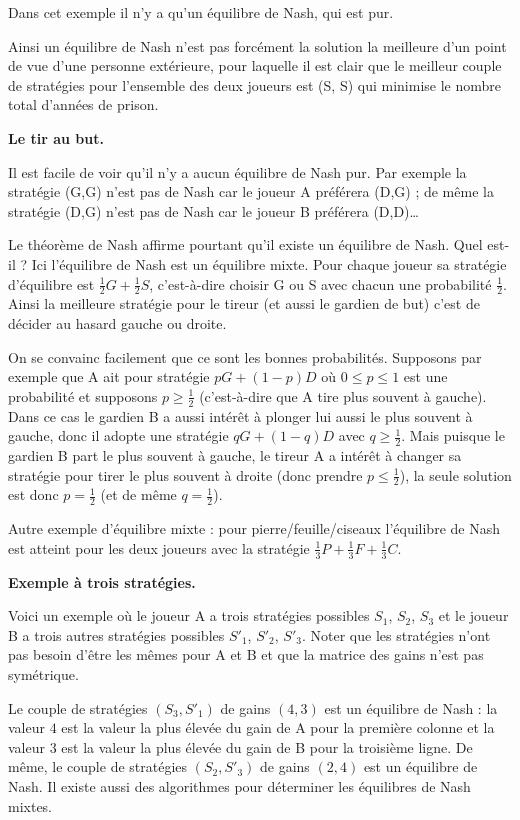 \documentclass[11pt,class=report,crop=false]{standalone}
\begin{document}
Dans cet exemple il n'y a qu'un équilibre de Nash, qui est pur.

Ainsi un équilibre de Nash n'est pas forcément la solution la meilleure d'un point de vue d'une personne extérieure, pour laquelle il est clair que le meilleur couple de stratégies pour l'ensemble des deux joueurs est (S, S) qui minimise le nombre total d'années de prison.


\bigskip
\textbf{Le tir au but.}




Il est facile de voir qu'il n'y a aucun équilibre de Nash pur. Par exemple la stratégie (G,G) n'est pas de Nash car le joueur A préférera (D,G) ; de même la stratégie (D,G) n'est pas de Nash car le joueur B préférera (D,D)\ldots

Le théorème de Nash affirme pourtant qu'il existe un équilibre de Nash. Quel est-il ? 
Ici l'équilibre de Nash est un équilibre mixte. Pour chaque joueur sa stratégie d'équilibre est $\frac12G+ \frac12S$, c'est-à-dire choisir G ou S avec chacun une probabilité $\frac12$. Ainsi la meilleure stratégie pour le tireur (et aussi le gardien de but) c'est de décider au hasard gauche ou droite.

On se convainc facilement que ce sont les bonnes probabilités. Supposons par exemple que A ait pour stratégie $pG + (1-p)D$ où $0 \le p \le 1$ est une probabilité
et supposons $p \ge \frac12$ (c'est-à-dire que A tire plus souvent à gauche). Dans ce cas le gardien B a aussi intérêt à plonger lui aussi le plus souvent à gauche, donc il adopte une stratégie $qG+(1-q)D$ avec $q \ge \frac12$. Mais puisque le gardien B part le plus souvent à gauche, le tireur A a intérêt à changer sa stratégie pour tirer le plus souvent à droite (donc prendre $p \le \frac12$), la seule solution est donc $p = \frac12$ (et de même $q=\frac12$).


Autre exemple d'équilibre mixte : pour \og{}pierre/feuille/ciseaux\fg{} l'équilibre de Nash est atteint pour les deux joueurs avec la stratégie $\frac13P+\frac13F+\frac13C$.




\bigskip
\textbf{Exemple à trois stratégies.}

Voici un exemple où le joueur A a trois stratégies possibles $S_1$, $S_2$, $S_3$ et le joueur B a trois autres stratégies possibles $S'_1$, $S'_2$, $S'_3$. Noter que les stratégies n'ont pas besoin d'être les mêmes pour A et B et que la matrice des gains n'est pas symétrique. 


Le couple de stratégies $(S_3,S'_1)$ de gains $(4,3)$ est un équilibre de Nash : la valeur $4$ est la valeur la plus élevée du gain de A pour la première colonne et la valeur $3$ est la valeur  la plus élevée du gain de B pour la troisième ligne.
De même, le couple de stratégies $(S_2,S'_3)$ de gains $(2,4)$ est un équilibre de Nash.
Il existe aussi des algorithmes pour déterminer les équilibres de Nash mixtes.
\end{document}
